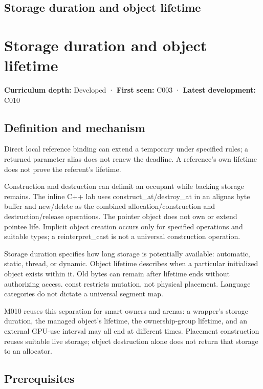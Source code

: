 \hypertarget{appendix-0b104bcba06b}{}
\section*{Storage duration and object lifetime}
\chapter{Storage duration and object lifetime}\label{appendix-0b104bcba06b-storage-duration-and-object-lifetime}

\textbf{Curriculum depth:} Developed · \textbf{First seen:} C003 · \textbf{Latest development:} C010

\section{Definition and mechanism}\label{appendix-0b104bcba06b-definition-and-mechanism}

Direct local reference binding can extend a temporary under specified rules; a returned parameter alias does not renew the deadline. A reference's own lifetime does not prove the referent's lifetime.

Construction and destruction can delimit an occupant while backing storage remains. The inline C++ lab uses construct\_at/destroy\_at in an alignas byte buffer and new/delete as the combined allocation/construction and destruction/release operations. The pointer object does not own or extend pointee life. Implicit object creation occurs only for specified operations and suitable types; a reinterpret\_cast is not a universal construction operation.

Storage duration specifies how long storage is potentially available: automatic, static, thread, or dynamic. Object lifetime describes when a particular initialized object exists within it. Old bytes can remain after lifetime ends without authorizing access. const restricts mutation, not physical placement. Language categories do not dictate a universal segment map.

M010 reuses this separation for smart owners and arenas: a wrapper's storage duration, the managed object's lifetime, the ownership-group lifetime, and an external GPU-use interval may all end at different times. Placement construction reuses suitable live storage; object destruction alone does not return that storage to an allocator.

\section{Prerequisites}\label{appendix-0b104bcba06b-prerequisites}

